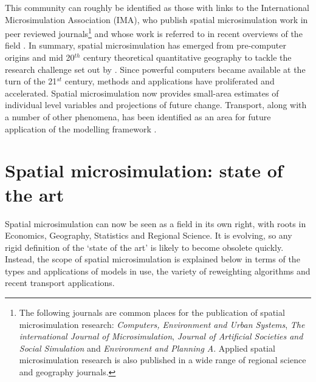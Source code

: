 \documentclass[a4paper, 11pt, twoside]{Thesis}
\begin{document}
This community can roughly be identified as those with links
to the International Microsimulation Association (IMA), 
who publish spatial microsimulation work in peer reviewed
journals\footnote{The following journals are common places for the
publication of spatial microsimulation research:
\emph{Computers, Environment and Urban Systems},
\emph{The international Journal of Microsimulation},
\emph{Journal of Artificial Societies and Social Simulation} and
\emph{Environment and Planning A}. Applied spatial microsimulation
research is also published in a wide range of regional science
and geography journals.
}
and whose work is referred to in recent overviews of the field
\citep{Tanton2013, O'Donoghue2013}.
In summary, spatial microsimulation has emerged
from pre-computer origins and mid 20$^{th}$ century theoretical quantitative
geography to tackle the research challenge set out by
\citet{Holm1987}. Since powerful computers became available at the turn
of the 21$^{st}$ century, methods and applications have
proliferated and accelerated. Spatial microsimulation now
provides small-area estimates
of individual level variables and projections of future change.
Transport, along with a number of other phenomena, has been
identified as an area for future application of the modelling framework
\citep{clarke2013conclusions}.

\section{Spatial microsimulation: state of the art}
\label{s:sotart}
Spatial microsimulation can now be seen as a field in its own right, with roots
in Economics, Geography, Statistics and Regional Science.  It is
evolving, so any rigid definition of the `state of the art' is likely to become
obsolete quickly. Instead, the scope of spatial
microsimulation is explained below in terms of the types and applications of models
in use, the variety of reweighting algorithms and recent transport applications.
\end{document}
